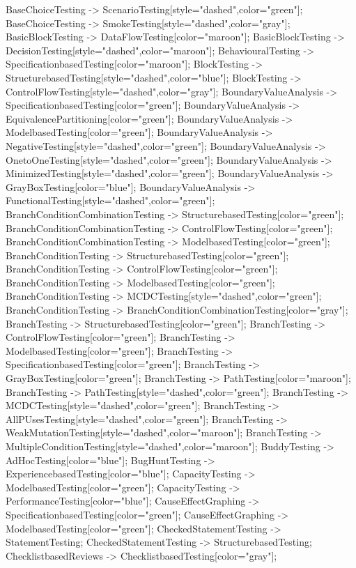 \documentclass{article}
\begin{document}
{BaseChoiceTesting -> ScenarioTesting[style="dashed",color="green"];
BaseChoiceTesting -> SmokeTesting[style="dashed",color="gray"];
BasicBlockTesting -> DataFlowTesting[color="maroon"];
BasicBlockTesting -> DecisionTesting[style="dashed",color="maroon"];
BehaviouralTesting -> SpecificationbasedTesting[color="maroon"];
BlockTesting -> StructurebasedTesting[style="dashed",color="blue"];
BlockTesting -> ControlFlowTesting[style="dashed",color="gray"];
BoundaryValueAnalysis -> SpecificationbasedTesting[color="green"];
BoundaryValueAnalysis -> EquivalencePartitioning[color="green"];
BoundaryValueAnalysis -> ModelbasedTesting[color="green"];
BoundaryValueAnalysis -> NegativeTesting[style="dashed",color="green"];
BoundaryValueAnalysis -> OnetoOneTesting[style="dashed",color="green"];
BoundaryValueAnalysis -> MinimizedTesting[style="dashed",color="green"];
BoundaryValueAnalysis -> GrayBoxTesting[color="blue"];
BoundaryValueAnalysis -> FunctionalTesting[style="dashed",color="green"];
BranchConditionCombinationTesting -> StructurebasedTesting[color="green"];
BranchConditionCombinationTesting -> ControlFlowTesting[color="green"];
BranchConditionCombinationTesting -> ModelbasedTesting[color="green"];
BranchConditionTesting -> StructurebasedTesting[color="green"];
BranchConditionTesting -> ControlFlowTesting[color="green"];
BranchConditionTesting -> ModelbasedTesting[color="green"];
BranchConditionTesting -> MCDCTesting[style="dashed",color="green"];
BranchConditionTesting -> BranchConditionCombinationTesting[color="gray"];
BranchTesting -> StructurebasedTesting[color="green"];
BranchTesting -> ControlFlowTesting[color="green"];
BranchTesting -> ModelbasedTesting[color="green"];
BranchTesting -> SpecificationbasedTesting[color="green"];
BranchTesting -> GrayBoxTesting[color="green"];
BranchTesting -> PathTesting[color="maroon"];
BranchTesting -> PathTesting[style="dashed",color="green"];
BranchTesting -> MCDCTesting[style="dashed",color="green"];
BranchTesting -> AllPUsesTesting[style="dashed",color="green"];
BranchTesting -> WeakMutationTesting[style="dashed",color="maroon"];
BranchTesting -> MultipleConditionTesting[style="dashed",color="maroon"];
BuddyTesting -> AdHocTesting[color="blue"];
BugHuntTesting -> ExperiencebasedTesting[color="blue"];
CapacityTesting -> ModelbasedTesting[color="green"];
CapacityTesting -> PerformanceTesting[color="blue"];
CauseEffectGraphing -> SpecificationbasedTesting[color="green"];
CauseEffectGraphing -> ModelbasedTesting[color="green"];
CheckedStatementTesting -> StatementTesting;
CheckedStatementTesting -> StructurebasedTesting;
ChecklistbasedReviews -> ChecklistbasedTesting[color="gray"];
}
\end{document}

